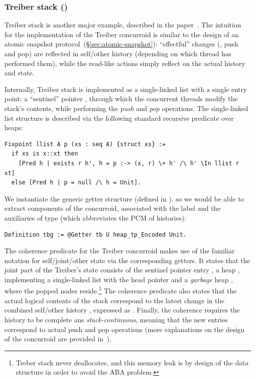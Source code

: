 \subsubsection{Treiber stack ()}
\label{sec:treiber-stack}

Treiber stack is another major example, described in the
paper~\cite[\S 4]{Sergey-al:ESOP15}. The intuition for the
implementation of the Treiber concurroid is similar to the design of
an atomic snapshot protocol~(\S\ref{sec:atomic-snapshot}):
``effectful'' changes (\eg, push and pop) are reflected in self/other
history (depending on which thread has performed them), while the
read-like actions simply reflect on the actual history and state.

Internally, Treiber stack is implemented as a single-linked list with
a single entry point: a ``sentinel'' pointer , through
which the concurrent threads modify the stack's contents, while
performing the \emph{push} and \emph{pop} operations. The
single-linked list structure is described via the following standard
recursive predicate over heaps:


\begin{lstlisting}
Fixpoint llist A p (xs : seq A) {struct xs} := 
  if xs is x::xt then 
    [Pred h | exists r h', h = p :-> (x, r) \+ h' /\ h' \In llist r xt]
  else [Pred h | p = null /\ h = Unit].  
\end{lstlisting}

We instantiate the generic getter structure (defined in
), so we would be able to extract components of the
concurroid, associated with the label  and the auxiliaries of
type  (which abbreviates the PCM of histories):

\begin{lstlisting}
Definition tbg := @Getter tb U heap_tp_Encoded Unit.  
\end{lstlisting}

The coherence predicate for the Treiber concurroid makes use of the
familiar notation for self/joint/other state via the corresponding
getters. It states that the joint part of the Treiber's state consists
of the sentinel pointer entry , a heap ,
implementing a single-linked list with the head pointer  and a
\emph{garbage} heap , where the popped nodes
reside.\footnote{Treber stack never deallocates, and this memory leak
  is by design of the data structure in order to avoid the ABA
  problem.} The coherence predicate also states that the actual
logical contents of the stack  correspond to the latest
change in the combined self/other history , expressed as
. Finally, the coherence requires the
history  to be complete ans \emph{stack-continuous}, meaning
that the new entries correspond to actual push and pop operations
(more explanations on the design of the concurroid are provided
in~\cite[\S 4]{Sergey-al:ESOP15}).

